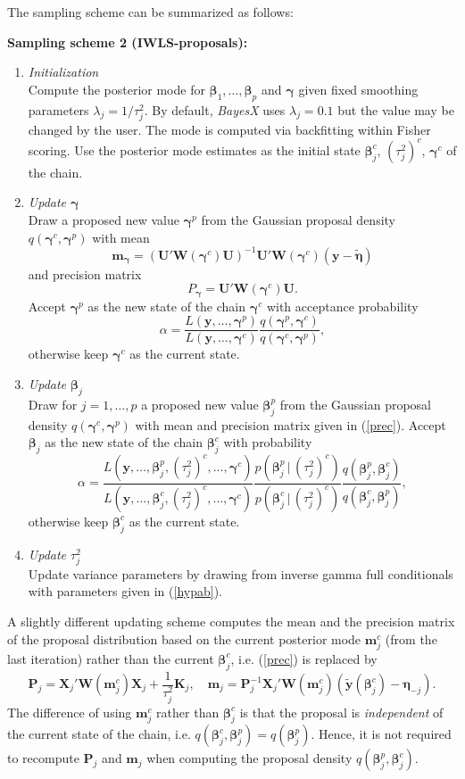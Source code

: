 \documentclass[11pt,a4paper,twoside]{bayesxarticle}
\def \Kvec {\vec{K}}
\def \Pvec {\vec{P}}
\def \betavec {\boldsymbol{\beta}}
\def \etavec {\boldsymbol{\eta}}
\def \gammavec {\boldsymbol{\gamma}}
\def \yvec {\mathbf{y}}
\def \mvec {\mathbf{m}}
\def \Kvec {\mathbf{K}}
\def \Uvec {\mathbf{U}}
\def \Wvec {\mathbf{W}}
\def \Pvec {\mathbf{P}}
\def \Xvec {\mathbf{X}}
\begin{document}
The sampling scheme can be summarized as follows:

{\bf Sampling scheme 2 (IWLS-proposals):}
\begin{enumerate}
\item {\em Initialization} \\
Compute the posterior mode for $\betavec_1,\dots,\betavec_p$ and $\gammavec$
given fixed smoothing parameters $\lambda_j = 1/\tau^2_j$. By
default, {\em BayesX} uses $\lambda_j = 0.1$ but the value may be
changed by the user. The mode is computed via backfitting within
Fisher scoring. Use the posterior mode estimates as the initial
state $\betavec_j^c$, $(\tau_j^2)^c$, $\gammavec^c$ of the chain.
\item {\em Update $\gammavec$} \\
Draw a proposed new value $\gammavec^p$ from the Gaussian proposal
density $q(\gammavec^c,\gammavec^p)$ with mean
$$
\mvec_{\gammavec} = (\Uvec' \Wvec(\gammavec^c) \Uvec)^{-1}\Uvec' \Wvec(\gammavec^c) (\yvec-\tilde{\etavec}
)
$$
and precision matrix
$$
P_{\gammavec} = \Uvec' \Wvec(\gammavec^c) \Uvec.
$$
Accept $\gammavec^p$ as the new state of the chain $\gammavec^c$ with
acceptance probability
$$
\alpha = \frac{ L(\yvec,\dots,\gammavec^p)} {L(\yvec,\dots,\gammavec^c)} \frac{
q(\gammavec^p,\gammavec^c)}{q(\gammavec^c,\gammavec^p)},
$$
otherwise keep $\gammavec^c$ as the current state.
\item {\em Update $\betavec_j$} \\
Draw for $j=1,\dots,p$ a proposed new value $\betavec_j^p$ from the
Gaussian proposal density $q(\gammavec^c,\gammavec^p)$ with mean and
precision matrix given in (\ref{prec}). Accept $\betavec_j$ as the
new state of the chain $\betavec_j^c$ with probability
$$
\alpha = \frac{
L(\yvec,\dots,\betavec^{p}_j,(\tau_j^2)^{c},\dots,\gammavec^c)}
{L(\yvec,\dots,\betavec^{c}_j,(\tau_j^2)^{c},\dots,\gammavec^c)}
\frac{p(\betavec_j^p \, | \, (\tau_j^2)^c)}{p(\betavec_j^c \, | \,
(\tau_j^2)^c)} \frac{
q(\betavec_j^p,\betavec_j^c)}{q(\betavec_j^c,\betavec_j^p)},
$$
otherwise keep $\betavec_j^c$ as the current state.
\item {\em Update $\tau^2_j$} \\
Update variance parameters by drawing from inverse gamma full
conditionals with parameters given in (\ref{hypab}).
\end{enumerate}

A slightly different updating scheme computes the mean and the
precision matrix of the proposal distribution based on the current
posterior mode $\mvec_j^c$ (from the last iteration) rather than the
current $\betavec_j^c$, i.e. (\ref{prec}) is replaced by
\begin{equation}
\label{precmode} \Pvec_j = \Xvec_j'\Wvec(\mvec_j^c)\Xvec_j + \frac{1}{\tau^2_j}\Kvec_j,
\quad \mvec_j = \Pvec_j^{-1}\Xvec_j'\Wvec(\mvec_j^c)(\tilde{\yvec}(\betavec^c_j) - \etavec_{-j}).
\end{equation}
The difference of using $\mvec_j^c$ rather than $\betavec_j^c$ is that
the proposal is {\em independent} of the current state of the
chain, i.e. $q(\betavec_j^c,\betavec_j^p) = q(\betavec_j^p)$. Hence, it is
not required to recompute $\Pvec_j$ and $\mvec_j$ when computing the
proposal density $q(\betavec_j^p,\betavec_j^c)$.
\end{document}
